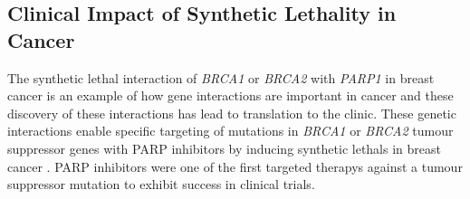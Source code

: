 \subsection{Clinical Impact of Synthetic Lethality in Cancer}



The \gls{synthetic lethal} interaction of \textit{BRCA1} or \textit{BRCA2} with \textit{PARP1} in breast cancer is an example of how gene interactions are important in cancer and these discovery of these interactions has lead to translation to the clinic. These genetic interactions enable specific targeting of \glspl{mutation} in \textit{BRCA1} or \textit{BRCA2} \gls{tumour suppressor} genes with \gls{PARP} inhibitors by inducing \glspl{synthetic lethal} in breast cancer \citep{Farmer2005}. \gls{PARP} inhibitors were one of the first \glspl{targeted therapy} against a \gls{tumour suppressor} \gls{mutation} to exhibit success in clinical trials. 

